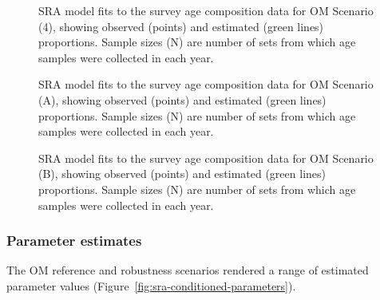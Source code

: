 \documentclass[11pt]{book}
\begin{document}
\begin{figure}[htb]

{\centering {} 

}

\caption{SRA model fits to the survey age composition data for OM Scenario (4), showing observed (points) and estimated (green lines) proportions. Sample sizes (N) are number of sets from which age samples were collected in each year.}\label{fig:sra-conditioned-comp-fit4}
\end{figure}
\clearpage


\begin{figure}[htb]

{\centering {} 

}

\caption{SRA model fits to the survey age composition data for OM Scenario (A), showing observed (points) and estimated (green lines) proportions. Sample sizes (N) are number of sets from which age samples were collected in each year.}\label{fig:sra-conditioned-comp-fitA}
\end{figure}
\clearpage


\begin{figure}[htb]

{\centering {} 

}

\caption{SRA model fits to the survey age composition data for OM Scenario (B), showing observed (points) and estimated (green lines) proportions. Sample sizes (N) are number of sets from which age samples were collected in each year.}\label{fig:sra-conditioned-comp-fitB}
\end{figure}
\hypertarget{sec:approach3-conditioning-parameters}{%
\subsubsection{Parameter estimates}\label{sec:approach3-conditioning-parameters}}

The OM reference and robustness scenarios rendered a range of estimated parameter values (Figure~\ref{fig:sra-conditioned-parameters}).
\end{document}
